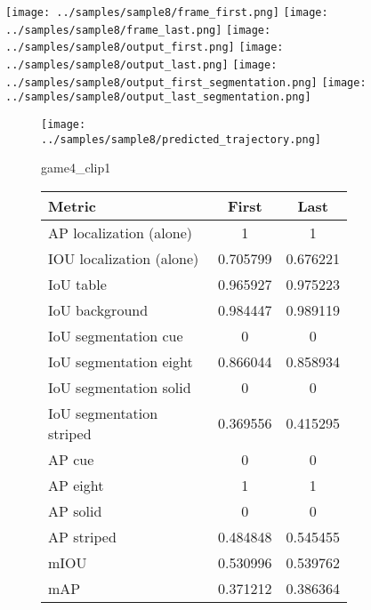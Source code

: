 \begin{figure}
    \texttt{[image: ../samples/sample8/frame\_first.png]}
    \texttt{[image: ../samples/sample8/frame\_last.png]}
    \newline
    \texttt{[image: ../samples/sample8/output\_first.png]}
    \texttt{[image: ../samples/sample8/output\_last.png]}
    \newline
    \texttt{[image: ../samples/sample8/output\_first\_segmentation.png]}
    \texttt{[image: ../samples/sample8/output\_last\_segmentation.png]}
    \newline
    \begin{subfigure}[b]{0.49\textwidth}
        \vspace{20pt}
        \texttt{[image: ../samples/sample8/predicted\_trajectory.png]}
        \caption*{game4\_clip1}
    \end{subfigure}
\begin{subfigure}[b]{0.49\textwidth}
    \begin{tabular}{|l|c|c|}
        \hline
        \textbf{Metric} & \textbf{First} & \textbf{Last} \\
        \hline
        AP localization (alone) & 1 & 1 \\ 
        IOU localization (alone) & 0.705799 & 0.676221 \\ 
        \hline
        IoU table & 0.965927 & 0.975223 \\ 
        IoU background & 0.984447 & 0.989119 \\ 
        \hline
        IoU segmentation cue & 0 & 0 \\ 
        IoU segmentation eight & 0.866044 & 0.858934 \\ 
        IoU segmentation solid & 0 & 0 \\ 
        IoU segmentation striped & 0.369556 & 0.415295 \\ 
        \hline
        AP cue & 0 & 0 \\ 
        AP eight & 1 & 1 \\ 
        AP solid & 0 & 0 \\ 
        AP striped & 0.484848 & 0.545455 \\ 
        \hline
        mIOU & 0.530996 & 0.539762 \\ 
        mAP & 0.371212 & 0.386364 \\ 
        \hline
    \end{tabular}    
\end{subfigure}
\end{figure}

